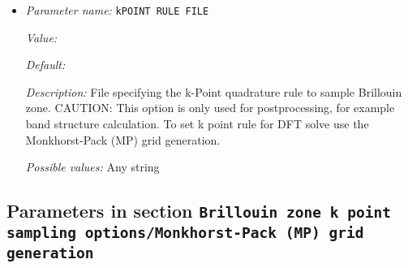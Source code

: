 \begin{itemize}
{\it Description:} Flag to control usage of time reversal symmetry 


{\it Possible values:} A boolean value (true or false)
\item {\it Parameter name:} {\tt kPOINT RULE FILE}
\label{parameters:Brillouin zone k point sampling options/kPOINT RULE FILE}
\label{parameters:Brillouin_20zone_20k_20point_20sampling_20options/kPOINT_20RULE_20FILE}


{\it Value:} 


{\it Default:} 


{\it Description:} File specifying the k-Point quadrature rule to sample Brillouin zone. CAUTION: This option is only used for postprocessing, for example band structure calculation. To set k point rule for DFT solve use the Monkhorst-Pack (MP) grid generation.


{\it Possible values:} Any string
\end{itemize}



\subsection{Parameters in section \tt Brillouin zone k point sampling options/Monkhorst-Pack (MP) grid generation}
\label{parameters:Brillouin_20zone_20k_20point_20sampling_20options/Monkhorst_2dPack_20_28MP_29_20grid_20generation}

